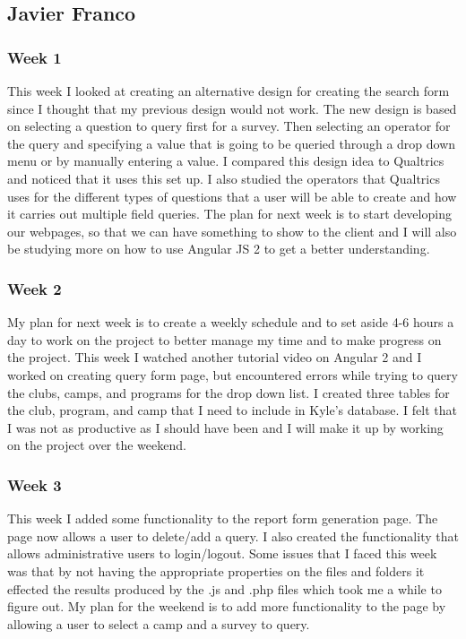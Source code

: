 \documentclass[letterpaper,10pt,serif, draftclsnofoot,onecolumn, compsoc, titlepage]{IEEEtran}
\begin{document}
\subsection{Javier Franco}
\subsubsection{Week 1}
This week I looked at creating an alternative design for creating the search form since I thought that my previous design would not work.
The new design is based on selecting a question to query first for a survey.
Then selecting an operator for the query and specifying a value that is going to be queried through a drop down menu or by manually entering a value.
I compared this design idea to Qualtrics and noticed that it uses this set up.
I also studied the operators that Qualtrics uses for the different types of questions that a user will be able to create and how it carries out multiple field queries.
The plan for next week is to start developing our webpages, so that we can have something to show to the client and I will also be studying more on how to use Angular JS 2 to get a better understanding.
\subsubsection{Week 2}
My plan for next week is to create a weekly schedule and to set aside 4-6 hours a day to work on the project to better manage my time and to make progress on the project.
This week I watched another tutorial video on Angular 2 and I worked on creating query form page, but encountered errors while trying to query the clubs, camps, and programs for the drop down list.
I created three tables for the club, program, and camp that I need to include in Kyle's database.
I felt that I was not as productive as I should have been and I will make it up by working on the project over the weekend.
\subsubsection{Week 3}
This week I added some functionality to the report form generation page.
The page now allows a user to delete/add a query.
I also created the functionality that allows administrative users to login/logout.
Some issues that I faced this week was that by not having the appropriate properties on the files and folders it effected the results produced by the .js and .php files which took me a while to figure out.
My plan for the weekend is to add more functionality to the page by allowing a user to select a camp and a survey to query.
\end{document}
